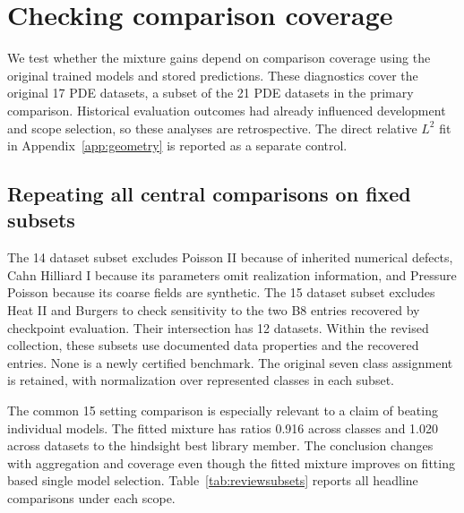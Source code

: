 \section{Checking comparison coverage}
\label{app:reanalysis}
We test whether the mixture gains depend on comparison coverage using the
original trained models and stored predictions. These diagnostics cover the
original 17 PDE datasets, a subset of the 21 PDE datasets in the primary
comparison. Historical evaluation outcomes had already influenced development
and scope selection, so these analyses are retrospective. The direct relative
$L^2$ fit in Appendix~\ref{app:geometry} is reported as a separate control.

\subsection{Repeating all central comparisons on fixed subsets}
\label{app:subsets}
The 14 dataset subset excludes Poisson II because of inherited numerical
defects, Cahn Hilliard I because its parameters omit realization information,
and Pressure Poisson because its coarse fields are synthetic.
The 15 dataset subset excludes Heat II and Burgers to check sensitivity to
the two B8 entries recovered by checkpoint evaluation. Their
intersection has 12 datasets. Within the revised collection, these subsets use
documented data properties and the recovered entries. None is a newly certified
benchmark. The original seven class assignment is retained, with normalization
over represented classes in each subset.

\begin{table}[h!]
\centering\small\setlength{\tabcolsep}{3pt}
\caption{\textbf{Sensitivity of the principal comparisons.} Each entry gives the
class ratio followed by the equal dataset ratio. Library and baseline denote
the respective best models identified after evaluation. Both mixtures use five fitting examples. Training budgets remain unequal.}
\label{tab:reviewsensitivity}
\resizebox{\linewidth}{!}{}
\end{table}

The common 15 setting comparison is especially relevant to a claim of beating
individual models. The fitted mixture has ratios 0.916 across classes and 1.020
across datasets to the hindsight best library member. The conclusion changes
with aggregation and coverage even though the fitted mixture improves on
fitting based single model selection.
Table~\ref{tab:reviewsubsets} reports all headline comparisons under each scope.

